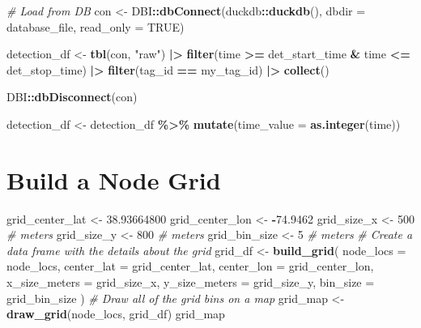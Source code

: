 \documentclass[
]{book}
\newenvironment{Shaded}{\begin{snugshade}}{\end{snugshade}}
\newcommand{\AttributeTok}[1]{\textcolor[rgb]{0.13,0.29,0.53}{#1}}
\newcommand{\CommentTok}[1]{\textcolor[rgb]{0.56,0.35,0.01}{\textit{#1}}}
\newcommand{\ConstantTok}[1]{\textcolor[rgb]{0.56,0.35,0.01}{#1}}
\newcommand{\DecValTok}[1]{\textcolor[rgb]{0.00,0.00,0.81}{#1}}
\newcommand{\FloatTok}[1]{\textcolor[rgb]{0.00,0.00,0.81}{#1}}
\newcommand{\FunctionTok}[1]{\textcolor[rgb]{0.13,0.29,0.53}{\textbf{#1}}}
\newcommand{\NormalTok}[1]{#1}
\newcommand{\OtherTok}[1]{\textcolor[rgb]{0.56,0.35,0.01}{#1}}
\newcommand{\SpecialCharTok}[1]{\textcolor[rgb]{0.81,0.36,0.00}{\textbf{#1}}}
\newcommand{\StringTok}[1]{\textcolor[rgb]{0.31,0.60,0.02}{#1}}
\begin{document}
\begin{Shaded}
\begin{Highlighting}[]
\CommentTok{\# Load from DB}
\NormalTok{con }\OtherTok{\textless{}{-}}\NormalTok{ DBI}\SpecialCharTok{::}\FunctionTok{dbConnect}\NormalTok{(duckdb}\SpecialCharTok{::}\FunctionTok{duckdb}\NormalTok{(), }
                      \AttributeTok{dbdir =}\NormalTok{ database\_file, }
                      \AttributeTok{read\_only =} \ConstantTok{TRUE}\NormalTok{)}

\NormalTok{detection\_df }\OtherTok{\textless{}{-}} \FunctionTok{tbl}\NormalTok{(con, }\StringTok{"raw"}\NormalTok{) }\SpecialCharTok{|\textgreater{}}
  \FunctionTok{filter}\NormalTok{(time }\SpecialCharTok{\textgreater{}=}\NormalTok{ det\_start\_time }\SpecialCharTok{\&}\NormalTok{ time }\SpecialCharTok{\textless{}=}\NormalTok{ det\_stop\_time) }\SpecialCharTok{|\textgreater{}}
  \FunctionTok{filter}\NormalTok{(tag\_id }\SpecialCharTok{==}\NormalTok{ my\_tag\_id) }\SpecialCharTok{|\textgreater{}}
  \FunctionTok{collect}\NormalTok{()}

\NormalTok{DBI}\SpecialCharTok{::}\FunctionTok{dbDisconnect}\NormalTok{(con)}

\NormalTok{detection\_df }\OtherTok{\textless{}{-}}\NormalTok{ detection\_df }\SpecialCharTok{\%\textgreater{}\%} \FunctionTok{mutate}\NormalTok{(}\AttributeTok{time\_value =} \FunctionTok{as.integer}\NormalTok{(time))}
\end{Highlighting}
\end{Shaded}

\section{Build a Node Grid}\label{build-a-node-grid}

\begin{Shaded}
\begin{Highlighting}[]
\NormalTok{grid\_center\_lat }\OtherTok{\textless{}{-}} \FloatTok{38.93664800}
\NormalTok{grid\_center\_lon }\OtherTok{\textless{}{-}} \SpecialCharTok{{-}}\FloatTok{74.9462}
\NormalTok{grid\_size\_x }\OtherTok{\textless{}{-}} \DecValTok{500} \CommentTok{\# meters}
\NormalTok{grid\_size\_y }\OtherTok{\textless{}{-}} \DecValTok{800} \CommentTok{\# meters}
\NormalTok{grid\_bin\_size }\OtherTok{\textless{}{-}} \DecValTok{5} \CommentTok{\# meters}
\CommentTok{\# Create a data frame with the details about the grid}
\NormalTok{grid\_df }\OtherTok{\textless{}{-}} \FunctionTok{build\_grid}\NormalTok{(}
  \AttributeTok{node\_locs =}\NormalTok{ node\_locs,}
  \AttributeTok{center\_lat =}\NormalTok{ grid\_center\_lat,}
  \AttributeTok{center\_lon =}\NormalTok{ grid\_center\_lon,}
  \AttributeTok{x\_size\_meters =}\NormalTok{ grid\_size\_x,}
  \AttributeTok{y\_size\_meters =}\NormalTok{ grid\_size\_y,}
  \AttributeTok{bin\_size =}\NormalTok{ grid\_bin\_size}
\NormalTok{)}
\CommentTok{\# Draw all of the grid bins on a map}
\NormalTok{grid\_map }\OtherTok{\textless{}{-}} \FunctionTok{draw\_grid}\NormalTok{(node\_locs, grid\_df)}
\NormalTok{grid\_map}
\end{Highlighting}
\end{Shaded}
\end{document}
